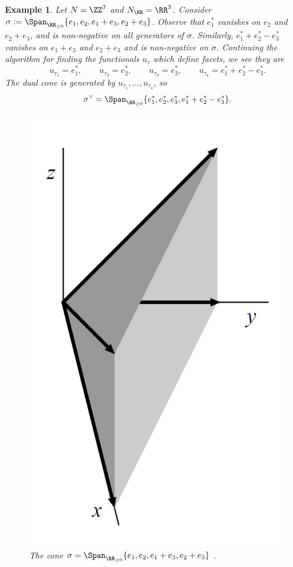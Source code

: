 \documentclass[12pt]{amsart}
\theoremstyle{plain}
\newtheorem{example}[theorem]{Example}
\begin{document}
\begin{example}\label{example:3dconeanddual}
Let $N = \ZZ^3$ and $N_\RR = \RR^3$.
Consider $\sigma := \Span_{\RR_{\ge 0}}\{ e_1, e_2, e_1+e_3, e_2 + e_3\}$.
Observe that $e_1^*$ vanishes on $e_2$ and $e_2+e_3$, and is non-negative on all generators of $\sigma$.
Similarly, $e_1^*+e_2^*-e_3^*$ vanishes on $e_1+e_3$ and $e_2+e_3$ and is non-negative on $\sigma$.
Continuing the algorithm for finding the functionals $u_\tau$ which define facets, we see they are
$$u_{\tau_1} = e_1^*, \qquad u_{\tau_2} = e_2^*, \qquad u_{\tau_3} = e_3^*, \qquad u_{\tau_4} = e_1^* + e_2^* - e_3^*.$$
The dual cone is generated by $u_{\tau_1}, \ldots, u_{\tau_4}$, so
$$\sigma^\vee = \Span_{\RR_{\ge 0}} \{e_1^*, e_2^*, e_3^*, e_1^* +e_2^* - e_3^*\}.$$
\begin{figure}[h]
\includegraphics[width=0.2 \textwidth]{../images/cox cone example 2}
\caption{The cone $\sigma= \Span_{\RR_{\ge 0}}\{ e_1, e_2, e_1+e_3, e_2 + e_3\}$ \cite[Figure 2]{CLS11}.}
\label{figure:3dcone}
\end{figure}
\end{example}
\end{document}

